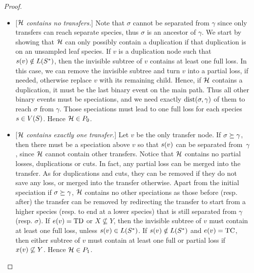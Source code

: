 \begin{proof}
    \begin{itemize}
        \item {[\emph{\(\mathcal{H}\) contains no transfers.}]}
            Note that \(\sigma\) cannot be separated from \(\gamma\) since only transfers can reach separate species, thus \(\sigma\) is an ancestor of \(\gamma\).
            We start by showing that \(\mathcal{H}\) can only possibly contain a duplication if that duplication is on an unsampled leaf species.
            If \(v\) is a duplication node such that \(s(v) \notin L(S^*)\), then the invisible subtree of \(v\) contains at least one full loss.
            In this case, we can remove the invisible subtree and turn \(v\) into a partial loss, if needed, otherwise replace \(v\) with its remaining child.
            Hence, if \(\mathcal{H}\) contains a duplication, it must be the last binary event on the main path.
            Thus all other binary events must be speciations, and we need exactly \(\mathrm{dist}(\sigma, \gamma)\) of them to reach \(\sigma\) from \(\gamma\).
            Those speciations must lead to one full loss for each species \(s \in V(S)\).
            Hence \(\mathcal{H} \in P_0\).

        \item {[\emph{\(\mathcal{H}\) contains exactly one transfer.}]}
            Let \(v\) be the only transfer node.
            If \(\sigma \succeq \gamma\), then there must be a speciation above \(v\) so that \(s(v)\) can be separated from~\(\gamma\), since \(\mathcal{H}\) cannot contain other transfers.
            Notice that \(\mathcal{H}\) contains no partial losses, duplications or cuts.
            In fact, any partial loss can be merged into the transfer.
            As for duplications and cuts, they can be removed if they do not save any loss, or merged into the transfer otherwise.
            Apart from the initial speciation if \(\sigma \succeq \gamma\), \(\mathcal{H}\) contains no other speciations as those before (resp. after) the transfer can be removed by redirecting the transfer to start from a higher species (resp. to end at a lower species) that is still separated from \(\gamma\) (resp. \(\sigma\)).
            If \(e(v) = \mathrm{TD}\) or \(X \not\subseteq Y\), then the invisible subtree of \(v\) must contain at least one full loss, unless \(s(v) \in L(S^*)\).
            If \(s(v) \notin L(S^*)\) and \(e(v) = \mathrm{TC}\), then either subtree of \(v\) must contain at least one full or partial loss if \(x(v) \not\subseteq Y\).
            Hence \(\mathcal{H} \in P_1\).


\end{itemize}
\end{proof}
